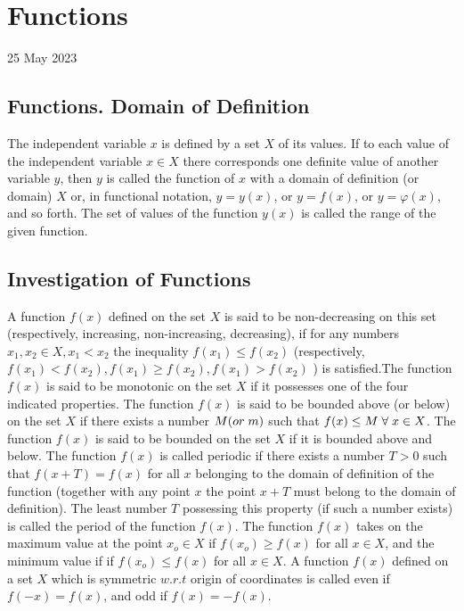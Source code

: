 \documentclass[12pt]{article}
\begin{document}
\tableofcontents
\newpage
\section{Functions}
25 May 2023
\subsection{Functions. Domain of Definition}
The independent variable $x$ is defined by a set $X$ of its values.
If to each value of the independent variable $x \in X$ there corresponds
one definite value of another variable $y$, then $y$ is called
the function of $x$ with a domain of definition (or domain) $X$ or,
in functional notation, $y=y(x)$, or $y=f(x)$, or $y=\varphi(x)$, and so
forth. The set of values of the function $y(x)$ is called the range
of the given function.

\subsection{Investigation of Functions}
A function $f(x)$ defined on the set $X$ is said to be non-decreasing
on this set (respectively, increasing, non-increasing, decreasing), if
for any numbers $x_1,x_2 \in X, x_1<x_2$ the inequality $f(x_1)\le f(x_2)$ (respectively, $f(x_1)<f(x_2),f(x_1)\ge f(x_2),f(x_1)>f(x_2)$ )  is satisfied.The function $f (x)$ is said to be monotonic on the set $X$ if it possesses one of the four indicated properties. The function $f(x)$ is said to be bounded above (or below) on the set $X$ if there exists a number $M(or\thickspace m)$ such that $f(x)\le M \thickspace \forall \thickspace x \in X$.  The function $f(x)$ is said to be bounded on the set $X$ if it is bounded above and below.
The function $f(x)$ is called periodic if there exists a number
$T > 0$ such that $f(x + T)=f(x)$ for all $x$ belonging to the domain
of definition of the function (together with any point $x$ the point
$x+T$ must belong to the domain of definition). The least number $T$
possessing this property (if such a number exists) is called the
period of the function $f(x)$. The function $f(x)$ takes on the maximum value at the point $x_o\in X$ if $f(x_o)\ge f(x)$ for all $x\in X$, and the minimum value if if $f(x_o) \le f(x)$ for all $x \in X$. A function $f(x)$ defined on a set $X$ which is symmetric $w.r.t$ origin of coordinates is called even if $f(-x)=f(x)$, and odd if $f(x)=-f(x)$.
\end{document}
